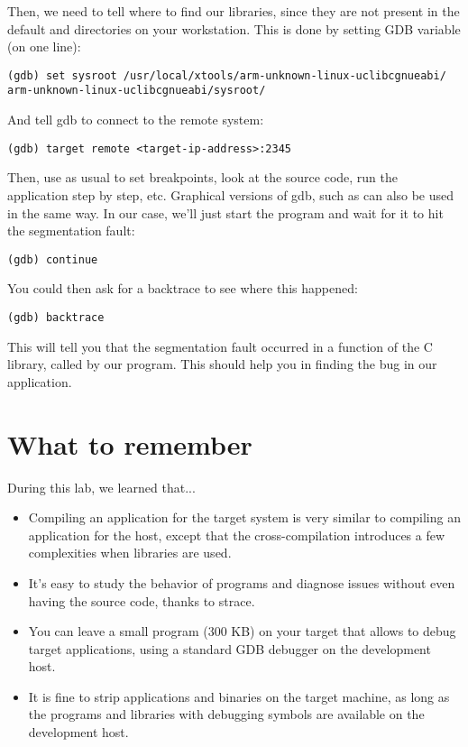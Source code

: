 Then, we need to tell where to find our libraries, since they are not
present in the default  and  directories on
your workstation. This is done by setting GDB  variable
(on one line):

\begin{verbatim}
(gdb) set sysroot /usr/local/xtools/arm-unknown-linux-uclibcgnueabi/
arm-unknown-linux-uclibcgnueabi/sysroot/
\end{verbatim}

And tell gdb to connect to the remote system:
\begin{verbatim}
(gdb) target remote <target-ip-address>:2345
\end{verbatim}

Then, use  as usual to set breakpoints, look at the source
code, run the application step by step, etc. Graphical versions of
gdb, such as  can also be used in the same way. In our case,
we'll just start the program and wait for it to hit the segmentation
fault:
\begin{verbatim}
(gdb) continue
\end{verbatim}

You could then ask for a backtrace to see where this happened:
\begin{verbatim}
(gdb) backtrace
\end{verbatim}

This will tell you that the segmentation fault occurred in a function
of the C library, called by our program. This should help you in
finding the bug in our application.

\section{What to remember}

During this lab, we learned that...
\begin{itemize}
\item Compiling an application for the target system is very similar
  to compiling an application for the host, except that the
  cross-compilation introduces a few complexities when libraries are
  used.

\item It's easy to study the behavior of programs and diagnose issues
  without even having the source code, thanks to strace.

\item You can leave a small  program (300 KB) on your target
  that allows to debug target applications, using a standard GDB
  debugger on the development host.

\item It is fine to strip applications and binaries on the target
  machine, as long as the programs and libraries with debugging
  symbols are available on the development host.

\end{itemize}

